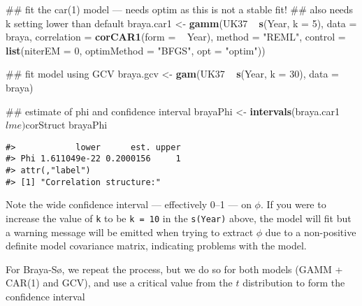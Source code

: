 \documentclass[12pt,]{article}
\newenvironment{Shaded}{\begin{snugshade}}{\end{snugshade}}
\newcommand{\KeywordTok}[1]{\textcolor[rgb]{0.13,0.29,0.53}{\textbf{{#1}}}}
\newcommand{\DataTypeTok}[1]{\textcolor[rgb]{0.13,0.29,0.53}{{#1}}}
\newcommand{\DecValTok}[1]{\textcolor[rgb]{0.00,0.00,0.81}{{#1}}}
\newcommand{\StringTok}[1]{\textcolor[rgb]{0.31,0.60,0.02}{{#1}}}
\newcommand{\NormalTok}[1]{{#1}}
\begin{document}
\begin{Shaded}
\begin{Highlighting}[]
\NormalTok{## fit the car(1) model --- needs optim as this is not a stable fit!}
\NormalTok{## also needs k setting lower than default}
\NormalTok{braya.car1 <-}\StringTok{ }\KeywordTok{gamm}\NormalTok{(UK37 ~}\StringTok{ }\KeywordTok{s}\NormalTok{(Year, }\DataTypeTok{k =} \DecValTok{5}\NormalTok{), }\DataTypeTok{data =} \NormalTok{braya, }
                   \DataTypeTok{correlation =} \KeywordTok{corCAR1}\NormalTok{(}\DataTypeTok{form =} \NormalTok{~}\StringTok{ }\NormalTok{Year),}
                   \DataTypeTok{method =} \StringTok{"REML"}\NormalTok{,}
                   \DataTypeTok{control =} \KeywordTok{list}\NormalTok{(}\DataTypeTok{niterEM =} \DecValTok{0}\NormalTok{, }\DataTypeTok{optimMethod =} \StringTok{"BFGS"}\NormalTok{, }
                                  \DataTypeTok{opt =} \StringTok{"optim"}\NormalTok{))}

\NormalTok{## fit model using GCV}
\NormalTok{braya.gcv <-}\StringTok{ }\KeywordTok{gam}\NormalTok{(UK37 ~}\StringTok{ }\KeywordTok{s}\NormalTok{(Year, }\DataTypeTok{k =} \DecValTok{30}\NormalTok{), }\DataTypeTok{data =} \NormalTok{braya)}

\NormalTok{## estimate of phi and confidence interval}
\NormalTok{brayaPhi <-}\StringTok{ }\KeywordTok{intervals}\NormalTok{(braya.car1$lme)$corStruct}
\NormalTok{brayaPhi}
\end{Highlighting}
\end{Shaded}

\begin{verbatim}
#>            lower      est. upper
#> Phi 1.611049e-22 0.2000156     1
#> attr(,"label")
#> [1] "Correlation structure:"
\end{verbatim}

Note the wide confidence interval --- effectively 0--1 --- on \(\phi\).
If you were to increase the value of \texttt{k} to be \texttt{k\ =\ 10}
in the \texttt{s(Year)} above, the model will fit but a warning message
will be emitted when trying to extract \(\phi\) due to a non-positive
definite model covariance matrix, indicating problems with the model.

For Braya-Sø, we repeat the process, but we do so for both models (GAMM
+ CAR(1) and GCV), and use a critical value from the \(t\) distribution
to form the confidence interval
\end{document}
